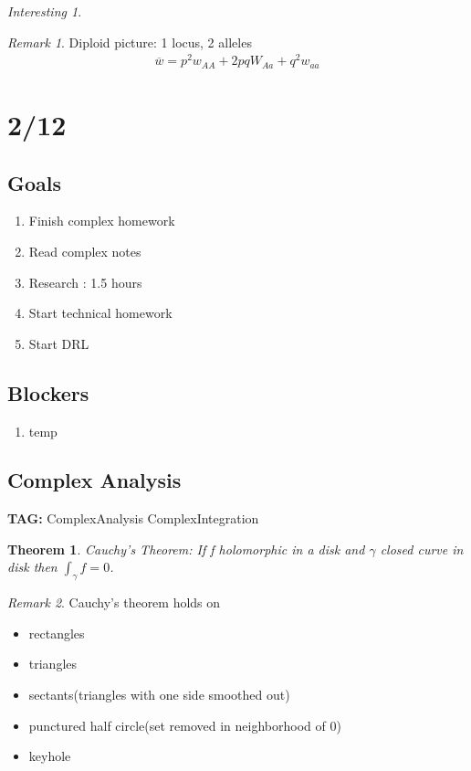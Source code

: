 \documentclass[11pt]{article}
\newtheorem{theorem}{Theorem}
\theoremstyle{remark}
\newtheorem{remark}{Remark}
\newtheorem{interest}{Interesting}
\begin{document}
\begin{interest}
\begin{remark}
	Diploid picture: 1 locus, 2 alleles
	\begin{align*}
		\overline{w} = p^2 w_{AA} + 2pq W_{Aa} + q^2 w_{aa}
	\end{align*}
\end{remark}

\section{2/12}

\subsection{Goals}

\begin{enumerate}
	\item Finish complex homework
	\item Read complex notes	
	\item Research : 1.5 hours
	\item Start technical homework
	\item Start DRL
\end{enumerate}

\subsection{Blockers}

\begin{enumerate}
	\item temp
\end{enumerate}

\subsection{Complex Analysis}

\textbf{TAG:} ComplexAnalysis ComplexIntegration

\begin{theorem}
	\textit{Cauchy's Theorem}: If f holomorphic in a disk and $\gamma$ closed curve in disk then $\int_{\gamma} f = 0$. 
\end{theorem}

\begin{remark}
	Cauchy's theorem holds on 
	\begin{itemize}
		\item rectangles
		\item triangles
		\item sectants(triangles with one side smoothed out)
		\item punctured half circle(set removed in neighborhood of 0)
		\item keyhole
	\end{itemize}


\end{remark}
\end{interest}
\end{document}
